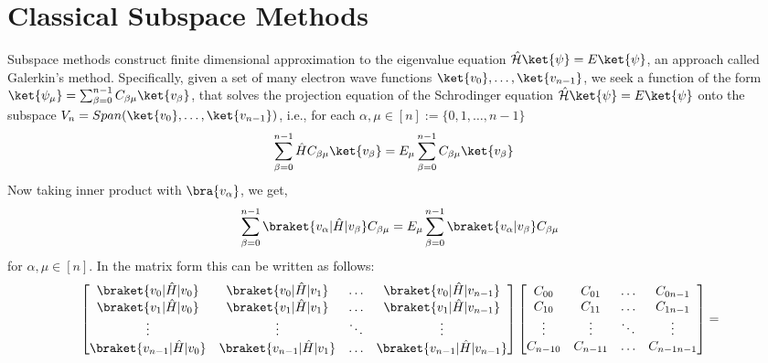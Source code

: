 \documentclass[12pt, oneside]{book}
\theoremstyle{definition}
\theoremstyle{definition}
\theoremstyle{remark}
\begin{document}
\section{Classical Subspace Methods}
Subspace methods construct finite dimensional approximation to the eigenvalue equation $\hat{\mathcal{H}}\ket{\psi}=E\ket{\psi}$, an approach called Galerkin's method. Specifically, given a set of many electron wave functions $\ket{v_0},\ldots,\ket{v_{n-1}}$, we seek a function of the form $\ket{\psi_{\mu}}=\sum_{\beta=0}^{n-1} C_{\beta\mu}\ket{v_\beta}$, that solves the projection equation of the Schrodinger equation $\hat{\mathcal{H}}\ket{\psi}=E\ket{\psi}$ onto the subspace $V_n=Span(\ket{v_0},\ldots,\ket{v_{n-1}})$, i.e., for each $\alpha ,\mu \in[n]:=\{0,1,\ldots ,n-1\}$
\begin{align*}
    \sum_{\beta=0}^{n-1} \hat{H}C_{\beta\mu}\ket{v_{\beta}}&=E_{\mu} \sum_{\beta=0}^{n-1} C_{\beta\mu}\ket{v_{\beta}}
\end{align*}
Now taking inner product with $\bra{v_{\alpha}}$, we get,
\[
\sum_{\beta=0}^{n-1} \braket{v_{\alpha}|\hat{H}|v_{\beta}} C_{\beta\mu} = E_{\mu} \sum_{\beta=0}^{n-1} \braket{v_{\alpha}|v_{\beta}} C_{\beta\mu}
\]
for $\alpha,\mu \in [n]$. In the matrix form this can be written as follows:
\begin{align*}
\begin{bmatrix} \braket{v_0|\hat{H}|v_0} & \braket{v_0|\hat{H}|v_1} & \ldots & \braket{v_0|\hat{H}|v_{n-1}} \\ 
\braket{v_1|\hat{H}|v_0} & \braket{v_1|\hat{H}|v_1} & \ldots & \braket{v_1|\hat{H}|v_{n-1}} \\
\vdots & \vdots & \ddots & \vdots \\
\braket{v_{n-1}|\hat{H}|v_0} & \braket{v_{n-1}|\hat{H}|v_1} & \ldots & \braket{v_{n-1}|\hat{H}|v_{n-1}}
\end{bmatrix}\begin{bmatrix} C_{00} & C_{01} & \ldots & C_{0n-1} \\ 
C_{10} & C_{11} & \ldots & C_{1n-1} \\ 
\vdots & \vdots & \ddots & \vdots \\
C_{n-10} & C_{n-11} & \ldots & C_{n-1n-1} 
\end{bmatrix} =
\end{align*}
\end{document}

